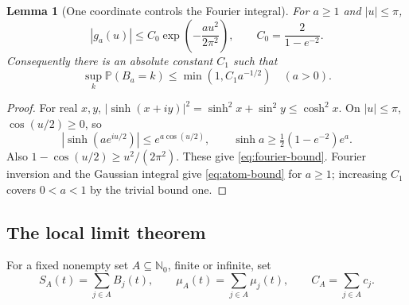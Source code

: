 \documentclass[11pt,a4paper]{article}
\numberwithin{equation}{section}
\newtheorem{lemma}[theorem]{Lemma}
\theoremstyle{definition}
\theoremstyle{remark}
\newcommand{\PP}{\mathbb P}
\newcommand{\N}{\mathbb N}
\begin{document}
\begin{lemma}[One coordinate controls the Fourier integral]
\label{lem:fourier}
For $a\ge1$ and $|u|\le\pi$,
\begin{equation}
|g_a(u)|\le C_0\exp\left(-\frac{au^2}{2\pi^2}\right),
\qquad C_0=\frac2{1-e^{-2}}.
\label{eq:fourier-bound}
\end{equation}
Consequently there is an absolute constant $C_1$ such that
\begin{equation}
\sup_k\PP(B_a=k)\le \min(1,C_1a^{-1/2})
\quad(a>0).
\label{eq:atom-bound}
\end{equation}
\end{lemma}
\begin{proof}
For real $x,y$, $|\sinh(x+iy)|^2=\sinh^2x+\sin^2y\le\cosh^2x$.
On $|u|\le\pi$, $\cos(u/2)\ge0$, so
\[
|\sinh(ae^{iu/2})|\le e^{a\cos(u/2)},
\qquad \sinh a\ge\tfrac12(1-e^{-2})e^a.
\]
Also $1-\cos(u/2)\ge u^2/(2\pi^2)$. These give
\cref{eq:fourier-bound}. Fourier inversion and the Gaussian integral
give \cref{eq:atom-bound} for $a\ge1$; increasing $C_1$ covers
$0<a<1$ by the trivial bound one.
\end{proof}

\subsection{The local limit theorem}
For a fixed nonempty set $A\subseteq\N_0$, finite or infinite, set
\[
S_A(t)=\sum_{j\in A}B_j(t),\qquad
\mu_A(t)=\sum_{j\in A}\mu_j(t),\qquad C_A=\sum_{j\in A}c_j.
\]
\end{document}
